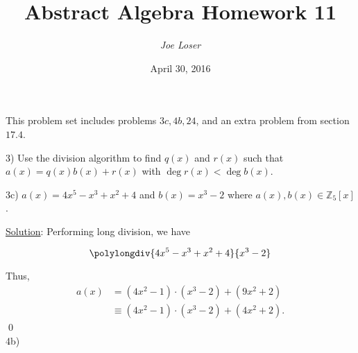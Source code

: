 \documentclass{article}
\title{Abstract Algebra Homework 11}
\author{\textit{Joe Loser}}
\date{April 30, 2016}
\begin{document}
\maketitle

This problem set includes problems $3c, 4b, 24$, and an extra problem from section $17.4$.

3) Use the division algorithm to find $q(x)$ and $r(x)$ such that $a(x) = q(x)b(x) + r(x)$ with $\deg r(x) < \deg b(x)$.

3c) $a(x) = 4x^5-x^3+x^2+4$ and $b(x) = x^3-2$ where $a(x), b(x) \in \mathbb{Z}_5[x]$.

\underline{Solution}: Performing long division, we have

$$\polylongdiv{4x^5-x^3+x^2+4}{x^3-2}$$

Thus,
\begin{align*}
	a(x) &= (4x^2-1) \cdot (x^3-2) + (9x^2+2) \\
	&\equiv (4x^2-1) \cdot (x^3-2) + (4x^2+2).
\end{align*} 
\qed \\

4b) 
\end{document}
